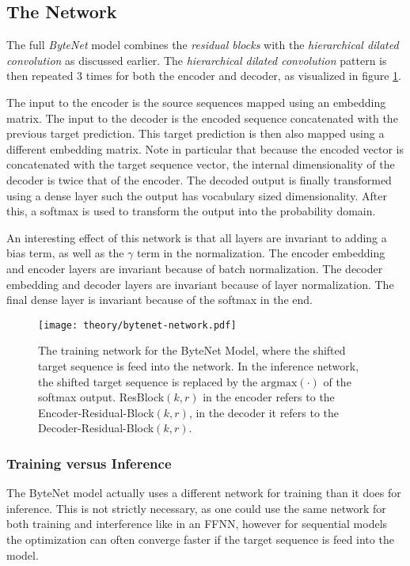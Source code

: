 \subsection{The Network}

The full \textit{ByteNet} model combines the \textit{residual blocks} with the \textit{hierarchical dilated convolution} as discussed earlier. The \textit{hierarchical dilated convolution} pattern is then repeated 3 times for both the encoder and decoder, as visualized in figure \ref{fig:bytenet:network}.

The input to the encoder is the source sequences mapped using an embedding matrix. The input to the decoder is the encoded sequence concatenated with the previous target prediction. This target prediction is then also mapped using a different embedding matrix. Note in particular that because the encoded vector is concatenated with the target sequence vector, the internal dimensionality of the decoder is twice that of the encoder. The decoded output is finally transformed using a dense layer such the output has vocabulary sized dimensionality. After this, a softmax is used to transform the output into the probability domain.

An interesting effect of this network is that all layers are invariant to adding a bias term, as well as the $\gamma$ term in the normalization. The encoder embedding and encoder layers are invariant because of batch normalization. The decoder embedding and decoder layers are invariant because of layer normalization. The final dense layer is invariant because of the softmax in the end.

\begin{figure}[h]
    \centering
    \texttt{[image: theory/bytenet-network.pdf]}
    \caption{The training network for the ByteNet Model, where the shifted target sequence is feed into the network. In the inference network, the shifted target sequence is replaced by the $\mathrm{argmax}(\cdot)$ of the softmax output. ResBlock$(k, r)$ in the encoder refers to the Encoder-Residual-Block$(k, r)$, in the decoder it refers to the Decoder-Residual-Block$(k, r)$.}
    \label{fig:bytenet:network}
\end{figure}

\subsubsection{Training versus Inference}
The ByteNet model actually uses a different network for training than it does for inference. This is not strictly necessary, as one could use the same network for both training and interference like in an FFNN, however for sequential models the optimization can often converge faster if the target sequence is feed into the model.

